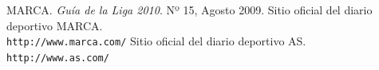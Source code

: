 \documentclass[a4paper,12pt]{article}
\begin{document}
\begin{thebibliography}{10}
 MARCA. \emph{Guía de la Liga 2010}. Nº 15, Agosto 2009.
 Sitio oficial del diario deportivo MARCA.\\
  \texttt{http://www.marca.com/}
 Sitio oficial del diario deportivo AS.\\
  \texttt{http://www.as.com/}
\end{thebibliography}
\end{document}
